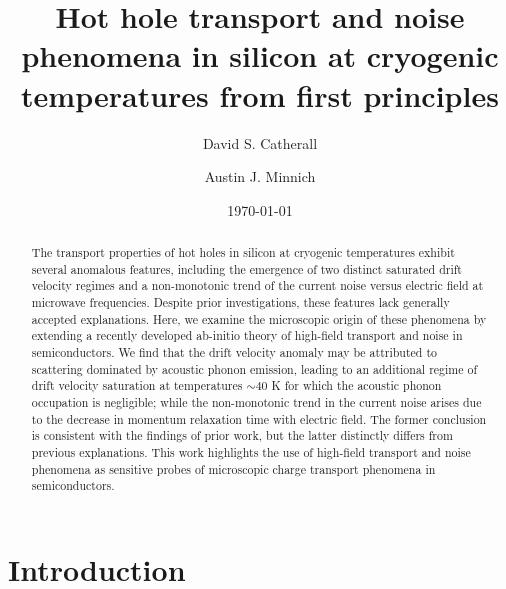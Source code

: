 \documentclass[aps,prx,preprint,letterpaper,groupedaddress,longbibliography]{revtex4-2}
\theoremstyle{definition}
\begin{document}
\title{Hot hole transport and noise phenomena in silicon at cryogenic temperatures from first principles}

\author{David S. Catherall}
\author{Austin J. Minnich}
\date{\today}

\begin{abstract}
The transport properties of hot holes in silicon at cryogenic temperatures exhibit several anomalous features, including the emergence of two distinct saturated drift velocity regimes and a non-monotonic trend of the current noise versus electric field at microwave frequencies. Despite prior investigations, these features lack generally accepted explanations. Here, we examine the microscopic origin of these phenomena by extending a recently developed ab-initio theory of high-field transport and noise in semiconductors. We find that the drift velocity anomaly may be attributed to scattering dominated by acoustic phonon emission, leading to an additional regime of drift velocity saturation at temperatures $\sim 40$ K for which the acoustic phonon occupation is negligible; while  the non-monotonic trend in the current noise arises due to the decrease in momentum relaxation time with electric field. The former conclusion is consistent with the findings of prior work, but the latter distinctly differs from previous explanations. This work highlights the use of high-field transport and noise phenomena as sensitive probes of microscopic charge transport phenomena in semiconductors.

\end{abstract}

\maketitle
\newpage

\section{Introduction}
\end{document}
